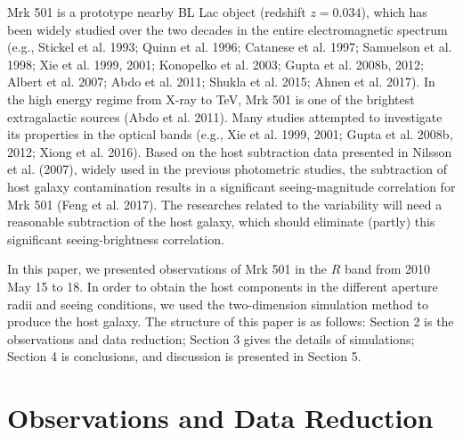 \documentclass[structabstract]{raa}
\begin{document}
   Mrk 501 is a prototype nearby BL Lac object (redshift $z=0.034$), which has been widely studied over the two decades in the
   entire electromagnetic spectrum (e.g., Stickel et al. 1993; Quinn et al. 1996; Catanese et al. 1997; Samuelson et al. 1998; Xie et al. 1999,
   2001; Konopelko et al. 2003; Gupta et al. 2008b, 2012; Albert et al. 2007; Abdo et al. 2011; Shukla et al. 2015; Ahnen et al. 2017). In the
   high energy regime from X-ray to TeV, Mrk 501 is one of the brightest extragalactic sources  (Abdo et al. 2011). Many studies attempted
   to investigate its properties in the optical bands (e.g., Xie et al. 1999, 2001; Gupta et al. 2008b, 2012; Xiong et al. 2016). Based on the
   host subtraction data presented in Nilsson et al. (2007), widely used in the previous photometric studies, the subtraction of host
   galaxy contamination results in a significant seeing-magnitude correlation for Mrk 501 (Feng et al. 2017). The researches related to
   the variability will need a reasonable subtraction of the host galaxy, which should eliminate (partly) this significant seeing-brightness
   correlation.

   In this paper, we presented observations of Mrk 501 in the $R$ band from 2010 May 15 to 18. In order to obtain the host components
   in the different aperture radii and seeing conditions, we used the two-dimension simulation method to produce the host galaxy. The
   structure of this paper is as follows: Section 2 is the observations and data reduction; Section 3 gives the details of simulations; Section 4
   is conclusions, and discussion is presented in Section 5.

\section{Observations and Data Reduction}
\end{document}
